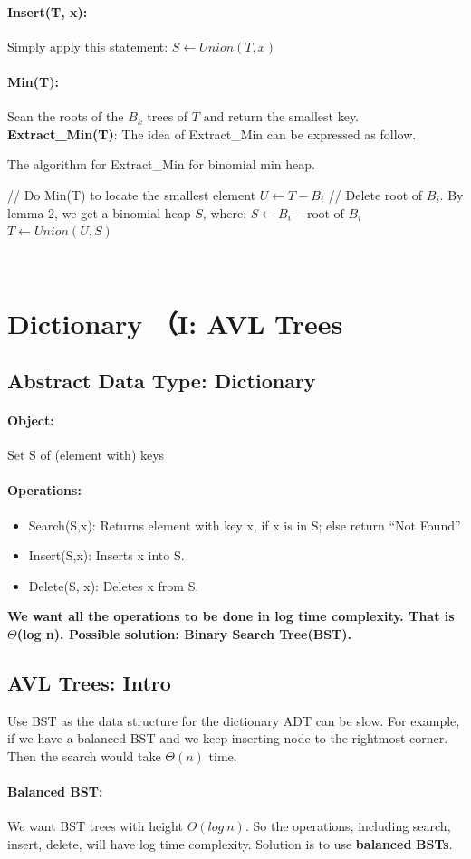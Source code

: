 \documentclass{article}
\begin{document}
\paragraph{Insert(T, x): }Simply apply this statement: $S \gets Union (T, x)$

\paragraph{Min(T):} Scan the roots of the $B_k$ trees of $T$ and return the smallest key.
\newpage
\noindent \textbf{Extract\_Min(T)}:
The idea of Extract\_Min can be expressed as follow.\begin{algorithm}[h]
\caption{The algorithm for Extract\_Min for binomial min heap.}\label{euclid}
\begin{algorithmic}
\State // Do Min(T) to locate the smallest element
\State $U \gets T - B_i$
\State // Delete root of $B_i$. By lemma 2, we get a binomial heap $S$, where:
\State $S \gets B_i - \text{root of $B_i$}$
\State $T \gets Union(U,S)$
\end{algorithmic}
\end{algorithm}\\
\section{Dictionary （I: AVL Trees}
\subsection{Abstract Data Type: Dictionary}
\paragraph{Object: }Set S of (element with) keys
\paragraph{Operations: }
\begin{itemize}
\item Search(S,x): Returns element with key x, if x is in S; else return ``Not Found''
\item Insert(S,x): Inserts x into S.
\item Delete(S, x): Deletes x from S.
\end{itemize}
\textbf{We want all the operations to be done in log time complexity. That is $\Theta$(log n). Possible solution: Binary Search Tree(BST).}
\subsection{AVL Trees: Intro}
Use BST as the data structure for the dictionary ADT can be slow. For example, if we have a balanced BST and we keep inserting node to the rightmost corner. Then the search would take $\Theta(n)$ time.\paragraph{Balanced BST: }We want BST trees with height $\Theta(log\ n)$. So the operations, including search, insert, delete, will have log time complexity. Solution is to use \textbf{balanced} \textbf{BSTs}. 
\end{document}
